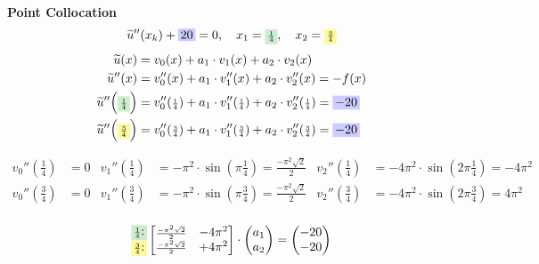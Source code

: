 \documentclass[
final,
a4paper,
oneside,
parskip=full,
headings=standardclasses,
headings=big,
pointednumbers,
fleqn
]{scrartcl}
\newcommand{\tfillb}[1]{\tfillc[#1][blue!20]}
\newcommand{\tfillg}[1]{\tfillc[#1][Green!20]}
\newcommand{\tfilly}[1]{\tfillc[#1][yellow!40]}
\newcommand{\fs}[2]{{\scriptstyle\frac{#1}{#2}}}
\newcommand{\kl}[1]{{\left( #1 \right)}}
\begin{document}
    {\bf{Point Collocation}} \\
    {\setlength{\abovedisplayskip}{-6pt}
    \setlength{\belowdisplayskip}{-12pt}
    \begin{align*}
        \widetilde{u}''\kl{x_k} + \tfillb{$20$} = 0, \quad x_1 = \tfillg{$\fs{1}{4}$}, \quad x_2 = \tfilly{$\fs{3}{4}$}
    \end{align*}}
    {\setlength{\abovedisplayskip}{6pt}
    \setlength{\belowdisplayskip}{-12pt}
    \begin{align*}
        \widetilde{u}\kl{x}   &= v_0\kl{x}   + a_1 \cdot v_1\kl{x}   + a_2 \cdot v_2\kl{x} \\
        \widetilde{u}''\kl{x} &= v_0''\kl{x} + a_1 \cdot v_1''\kl{x} + a_2 \cdot v_2''\kl{x} = -f\kl{x} \\
        \widetilde{u}''\kl{\tfillg{$\fs{1}{4}$}} &= v_0''\kl{\fs{1}{4}} + a_1 \cdot v_1''\kl{\fs{1}{4}} + a_2 \cdot v_2''\kl{\fs{1}{4}} = \tfillb{$-20$} \\
        \widetilde{u}''\kl{\tfilly{$\fs{3}{4}$}} &= v_0''\kl{\fs{3}{4}} + a_1 \cdot v_1''\kl{\fs{3}{4}} + a_2 \cdot v_2''\kl{\fs{3}{4}} = \tfillb{$-20$} \\
    \end{align*}}
    \begin{minipage}{0.8\textwidth}
        \setlength{\abovedisplayskip}{-6pt}
        \setlength{\belowdisplayskip}{-12pt}
        \begin{align*}
        v_0''\kl{\fs{1}{4}} &= 0 &
        v_1''\kl{\fs{1}{4}} &= -\pi^2 \cdot \sin\kl{\pi \fs{1}{4}} = \fs{-\pi^2 \sqrt{2}}{2} &
        v_2''\kl{\fs{1}{4}} &= -4 \pi^2 \cdot \sin\kl{2 \pi \fs{1}{4}} = -4\pi^2\\
        v_0''\kl{\fs{3}{4}} &= 0 &
        v_1''\kl{\fs{3}{4}} &= -\pi^2 \cdot \sin\kl{\pi \fs{3}{4}} = \fs{-\pi^2 \sqrt{2}}{2} &
        v_2''\kl{\fs{3}{4}} &= -4 \pi^2 \cdot \sin\kl{2 \pi \fs{3}{4}} = 4\pi^2\\
        \end{align*}
    \end{minipage}
    {\setlength{\abovedisplayskip}{-12pt}
    \setlength{\belowdisplayskip}{3pt}
    \begin{align*}
        \begin{matrix}
            \tfillg{$\fs{1}{4}$:} \\
            \tfilly{$\fs{3}{4}$:} \\
        \end{matrix}
        \begin{bmatrix}
            \fs{-\pi^2 \sqrt{2}}{2} & -4\pi^2 \\
            \fs{-\pi^2 \sqrt{2}}{2} & +4\pi^2 \\
        \end{bmatrix} \cdot
        \begin{pmatrix}
            a_1 \\
            a_2
        \end{pmatrix} = 
        \begin{pmatrix}
            -20 \\
            -20
        \end{pmatrix} 
    \end{align*}} \\
\end{document}
